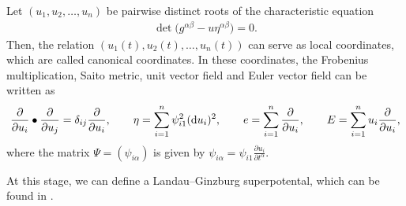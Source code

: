 \begin{Proposition}
Let $(u_1,u_2,\dots,u_n)$ be pairwise distinct roots of the characteristic equation
\begin{gather}\label{spectral curve}
\det\bigl(g^{\alpha\beta} -u\eta^{\alpha\beta} \bigr) = 0.
\end{gather}
Then, the relation $(u_1(t),u_2(t),\dots,u_n(t))$ can serve as local coordinates, which are called canonical coordinates. In these coordinates, the Frobenius multiplication, Saito metric, unit vector field and Euler vector field can be written as
\begin{gather}
\frac{\partial}{\partial u_i}\bullet \frac{\partial}{\partial u_j}=\delta_{ij}\frac{\partial}{\partial u_i},\qquad \eta=\sum_{i=1}^{n}\psi_{i1}^2 ({\rm d}u_i)^2, \qquad e=\sum_{i=1}^n\frac{\partial}{\partial u_i},\qquad E=\sum_{i=1}^n u_i\frac{\partial}{\partial u_i},\label{Dubrovin Frobenius structure in canonical coordinates 1}
\end{gather}
where the matrix $\Psi=( \psi_{i\alpha})$ is given by
$
\psi_{i\alpha}=\psi_{i1}\frac{\partial u_i}{\partial t^{\alpha}}$.
\end{Proposition}
At this stage, we can define a Landau--Ginzburg superpotental, which can be found in \cite[Definition~5.7]{B.Dubrovin3}.

